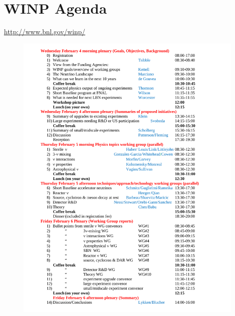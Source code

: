 \section{WINP Agenda}
\label{sec:Agenda}
\url{http://www.bnl.gov/winp/}
\begin{figure}[h] 
\includegraphics[height=0.9\textheight]{WINP_Agenda_v12.pdf}
\end{figure}
